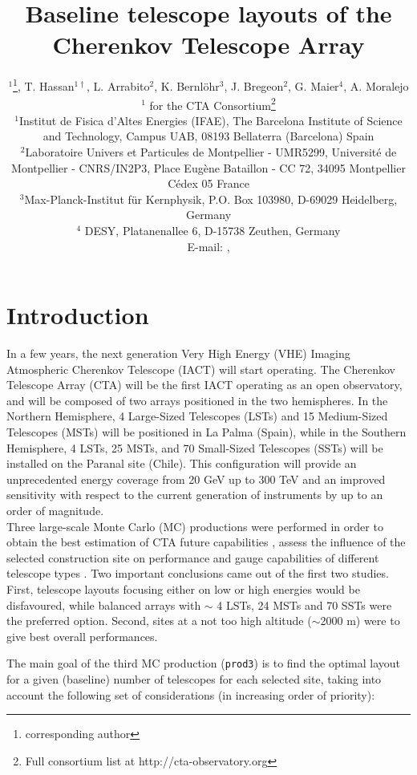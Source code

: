 \documentclass{PoS}
\title{Baseline telescope layouts of the Cherenkov Telescope Array}
\author{\speaker{P. Cumani}$^{1}$\thanks{corresponding author}, T. Hassan$^{1 \dagger}$, L. Arrabito$^{2}$, K. Bernl{\"o}hr$^{3}$, J. Bregeon$^{2}$, G. Maier$^{4}$, A. Moralejo$^{1}$ for the CTA Consortium\footnote{Full consortium list at http://cta-observatory.org}\\
       $^{1}$Institut de Fisica d'Altes Energies (IFAE), The Barcelona Institute of Science and Technology, Campus UAB, 08193 Bellaterra (Barcelona) Spain\\
       $^{2}$Laboratoire Univers et Particules de Montpellier - UMR5299, Universit\'e de Montpellier - CNRS/IN2P3, Place Eug\`ene Bataillon - CC 72, 34095 Montpellier C\'edex 05 France\\
       $^{3}$Max-Planck-Institut f{\"u}r Kernphysik, P.O. Box 103980, 
        D-69029 Heidelberg, Germany\\
        $^{4}$ DESY, Platanenallee 6, D-15738 Zeuthen, Germany\\
       E-mail: \email{pcumani@ifae.es}, \email{thassan@ifae.es}}
\newcommand{\mcprod}[1]{\texttt{prod#1}}
\begin{document}
\section{Introduction}
\label{sec:intro}
In a few years, the next generation Very High Energy (VHE) Imaging Atmospheric Cherenkov Telescope (IACT) will start operating. The Cherenkov Telescope Array (CTA) will be the first IACT operating as an open observatory, and will be composed of two arrays positioned in the two hemispheres. In the Northern Hemisphere, 4 Large-Sized Telescopes (LSTs) \cite{LSTgamma} and 15 Medium-Sized Telescopes (MSTs) \cite{MSTgamma, SCTgamma} will be positioned in La Palma (Spain), while in the Southern Hemisphere,  4 LSTs, 25 MSTs, and 70 Small-Sized Telescopes (SSTs) \cite{Montaruli:2015} will be installed on the Paranal site (Chile). This configuration will provide an unprecedented energy coverage from 20 GeV up to 300 TeV and an improved sensitivity with respect to the current generation of instruments by up to an order of magnitude.\\
Three large-scale Monte Carlo (MC) productions were performed in order to obtain the best estimation of CTA future capabilities \cite{APP_CTA_MC, MC_ICRC:2013,Hassan-2015}, assess the influence of the selected construction site on performance \cite{Hassan2017Apj, MC_ICRC_site:2015} and gauge capabilities of different telescope types \cite{Wood:2016, GCT}. Two important conclusions came out of the first two studies. First, telescope layouts focusing either on low or high energies would be disfavoured, while balanced arrays with $\sim$ 4 LSTs, 24 MSTs and 70 SSTs were the preferred option. Second, sites at a not too high altitude ($\sim$2000 m) were to give best overall performances.


The main goal of the third MC production (\mcprod{3}) is to find the optimal layout for a given (baseline) number of telescopes for each selected site, taking into account the following set of considerations (in increasing order of priority):
\end{document}
